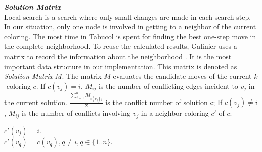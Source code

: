 \documentclass[12pt,a4paper,twoside]{scrartcl}
\numberwithin{equation}{section}
\begin{document}
\emph{\textbf{Solution Matrix}}\\
Local search is a search where only small changes are made in each search step. In our situation, only one node is involved in getting to a neighbor of the current coloring. The most time in Tabucol is spent for finding the best one-step move in the complete neighborhood. To reuse the calculated results, Galinier uses a matrix to record the information about the neighborhood \cite {galinier2006survey}. It is the most important data structure in our implementation. This matrix is denoted as \emph{Solution Matrix} $M.$ The matrix $M$  evaluates the candidate moves of the current $k$-coloring $c$. If $c(v_j) = i$, $M_{ij}$ is the number of conflicting edges incident to $v_j$ in the current solution. $\frac{\sum_{j=1}^n M_{c(v_j)j}}{2}$ is the conflict number of solution $c$;
If $c(v_j)\neq i$, $M_{ij}$ is the number of conflicts involving $v_j$ in a neighbor coloring $c'$ of $c$:

$c'(v_j) = i$.\\
 $c'(v_q) = c(v_q), q \neq i,q \in \{1..n\}.$ \\
 
\end{document}
